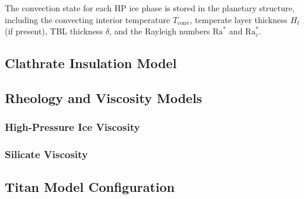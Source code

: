 The convection state for each HP ice phase is stored in the planetary structure, including the convecting interior temperature $T_{\text{conv}}$, temperate layer thickness $H_t$ (if present), TBL thickness $\delta$, and the Rayleigh numbers $\text{Ra}^*$ and $\text{Ra}^*_c$.

\subsection{Clathrate Insulation Model}


\subsection{Rheology and Viscosity Models}

\subsubsection{High-Pressure Ice Viscosity}


\subsubsection{Silicate Viscosity}


\subsection{Titan Model Configuration}


